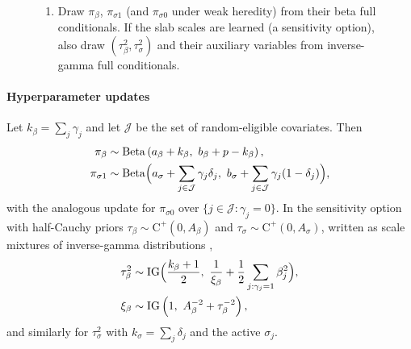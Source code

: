 \begin{figure}[!htbp]
{\begin{minipage}{0.95\textwidth}
\begin{enumerate}[leftmargin=*,itemsep=2pt]
  \begin{enumerate}[label=(\alph*),leftmargin=*]
  \item compute $q_{ij}$, $b_{ij}$ and $\mathrm{BF}^{\sigma}_j$ in \eqref{eq:bf-sigma} by one-dimensional quadrature of \eqref{eq:ell}
  \item set $\delta_j=1$ with probability $\dfrac{\pi_j\,\mathrm{BF}^{\sigma}_j}{\pi_j\,\mathrm{BF}^{\sigma}_j+1-\pi_j}$, where $\pi_j=\gamma_j\pi_{\sigma1}+(1-\gamma_j)\pi_{\sigma0}$
  \item if $\delta_j=1$ draw $|\sigma_j|$ from the density proportional to $\exp\{\ell_j(\sigma)\}\phi(\sigma\mid0,\tau_\sigma^2)$ on $\sigma>0$, attach a random sign, and draw each $z_{ij}$ from Proposition~\ref{prop:marginal}. Otherwise set $\sigma_j=0$.
  \end{enumerate}
\item Draw $\pi_\beta$, $\pi_{\sigma1}$ (and $\pi_{\sigma0}$ under weak heredity) from their beta full conditionals. If the slab scales are learned (a sensitivity option), also draw $(\tau_\beta^2,\tau_\sigma^2)$ and their auxiliary variables from inverse-gamma full conditionals.
\end{enumerate}
\end{minipage}}
\end{figure}

\paragraph{Hyperparameter updates} Let $k_\beta=\sum_j\gamma_j$ and let $\mathcal J$ be the set of random-eligible covariates. Then
\begin{align*}
\pi_\beta&\sim\Betad\left(a_\beta+k_\beta,\ b_\beta+p-k_\beta\right),\\
\pi_{\sigma1}&\sim\Betad\Big(a_\sigma+\sum_{j\in\mathcal J}\gamma_j\delta_j,\ b_\sigma+\sum_{j\in\mathcal J}\gamma_j(1-\delta_j)\Big),
\end{align*}
with the analogous update for $\pi_{\sigma0}$ over $\{j\in\mathcal J:\gamma_j=0\}$. In the sensitivity option with half-Cauchy priors $\tau_\beta\sim\mathrm{C}^+(0,A_\beta)$ and $\tau_\sigma\sim\mathrm{C}^+(0,A_\sigma)$, written as scale mixtures of inverse-gamma distributions \citep{makalic2016simple},
\begin{align*}
\tau_\beta^2&\sim\IG\Big(\frac{k_\beta+1}{2},\ \frac{1}{\xi_\beta}+\frac12\sum_{j:\gamma_j=1}\beta_j^2\Big),\\
\xi_\beta&\sim\IG\left(1,\ A_\beta^{-2}+\tau_\beta^{-2}\right),
\end{align*}
and similarly for $\tau_\sigma^2$ with $k_\sigma=\sum_j\delta_j$ and the active $\sigma_j$.

